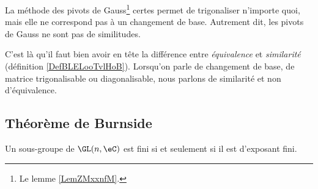 \begin{remark}
    La méthode des pivots de Gauss\footnote{Le lemme \ref{LemZMxxnfM}.} certes permet de trigonaliser n'importe quoi, mais elle ne correspond pas à un changement de base. Autrement dit, les pivots de Gauss ne sont pas de similitudes.

    C'est là qu'il faut bien avoir en tête la différence entre \emph{équivalence} et \emph{similarité} (définition \ref{DefBLELooTvlHoB}). Lorsqu'on parle de changement de base, de matrice trigonalisable ou diagonalisable, nous parlons de similarité et non d'équivalence.
\end{remark}

\subsection{Théorème de Burnside}

\begin{theorem}\label{ThooJLTit}
    Un sous-groupe de \( \GL(n,\eC)\) est fini si et seulement si il est d'exposant fini.
\end{theorem}

